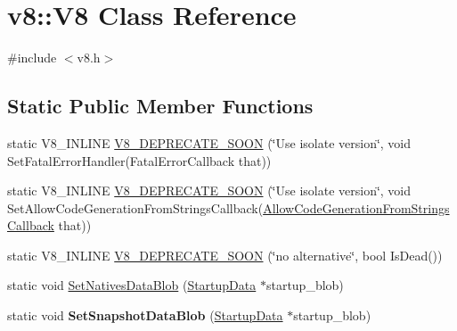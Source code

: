 \hypertarget{classv8_1_1V8}{}\section{v8\+:\+:V8 Class Reference}
\label{classv8_1_1V8}


{\ttfamily \#include $<$v8.\+h$>$}

\subsection*{Static Public Member Functions}
\begin{DoxyCompactItemize}
\item 
static V8\+\_\+\+I\+N\+L\+I\+N\+E \hyperlink{classv8_1_1V8_a8b60b972ed90525edc0adbb8904144f7}{V8\+\_\+\+D\+E\+P\+R\+E\+C\+A\+T\+E\+\_\+\+S\+O\+O\+N} (\char`\"{}Use isolate version\char`\"{}, void Set\+Fatal\+Error\+Handler(Fatal\+Error\+Callback that))
\item 
static V8\+\_\+\+I\+N\+L\+I\+N\+E \hyperlink{classv8_1_1V8_a2171f54e303728e24f659b11a60a9635}{V8\+\_\+\+D\+E\+P\+R\+E\+C\+A\+T\+E\+\_\+\+S\+O\+O\+N} (\char`\"{}Use isolate version\char`\"{}, void Set\+Allow\+Code\+Generation\+From\+Strings\+Callback(\hyperlink{namespacev8_a521d909ec201742a1cb35d50a8e2a3c2}{Allow\+Code\+Generation\+From\+Strings\+Callback} that))
\item 
static V8\+\_\+\+I\+N\+L\+I\+N\+E \hyperlink{classv8_1_1V8_af8c7e43eda115538fa012e562ca611c8}{V8\+\_\+\+D\+E\+P\+R\+E\+C\+A\+T\+E\+\_\+\+S\+O\+O\+N} (\char`\"{}no alternative\char`\"{}, bool Is\+Dead())
\item 
static void \hyperlink{classv8_1_1V8_ae6a0f605e072e9e27e3666559d5c351f}{Set\+Natives\+Data\+Blob} (\hyperlink{classv8_1_1StartupData}{Startup\+Data} $\ast$startup\+\_\+blob)
\item 
\hypertarget{classv8_1_1V8_a231b3cd8e5578497ee36210c0411f14c}{}static void {\bfseries Set\+Snapshot\+Data\+Blob} (\hyperlink{classv8_1_1StartupData}{Startup\+Data} $\ast$startup\+\_\+blob)\label{classv8_1_1V8_a231b3cd8e5578497ee36210c0411f14c}


\end{DoxyCompactItemize}
